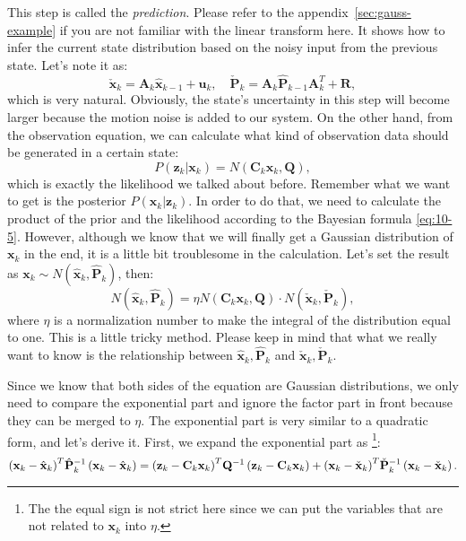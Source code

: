 This step is called the \textit{prediction}. Please refer to the appendix~\ref{sec:gauss-example} if you are not familiar with the linear transform here. It shows how to infer the current state distribution based on the noisy input from the previous state. Let's note it as:
\begin{equation}
	\check{\mathbf{x}}_k = {\mathbf{A}_k {{\hat{\mathbf{x}}}_{k - 1}} + {\mathbf{u}_k}}, \quad \check{\mathbf{P}}_k = {\mathbf{A}_k \hat{\mathbf{P}}_{k-1} { \mathbf{A}^T_k} + \mathbf{R}},
\end{equation}
which is very natural. Obviously, the state's uncertainty in this step will become larger because the motion noise is added to our system. On the other hand, from the observation equation, we can calculate what kind of observation data should be generated in a certain state:
\begin{equation}
	P\left( {{\mathbf{z}_k}|{\mathbf{x}_k}} \right) = N\left( {{\mathbf{C}_k}{\mathbf{x}_k},\mathbf{Q}} \right) ,
\end{equation}
which is exactly the likelihood we talked about before. Remember what we want to get is the posterior $P\left( {{\mathbf{x}_k}|{\mathbf{z}_k}} \right) $. In order to do that, we need to calculate the product of the prior and the likelihood according to the Bayesian formula \eqref{eq:10-5}. However, although we know that we will finally get a Gaussian distribution of $\mathbf{x}_k$ in the end, it is a little bit troublesome in the calculation. Let's set the result as $\mathbf{x}_k \sim N(\mathbf{\hat{x}}_k, \mathbf{\hat{P}}_k )$, then:
\begin{equation}
	N(\mathbf{\hat{x}}_k, \mathbf{\hat{P}}_k ) = \eta N\left( {{\mathbf{C}_k}{\mathbf{x}_k},\mathbf{Q}} \right) \cdot N( \mathbf{\check{x}}_k, \mathbf{\check{P}}_k),
\end{equation}
where $\eta$ is a normalization number to make the integral of the distribution equal to one. This is a little tricky method. Please keep in mind that what we really want to know is the relationship between $\hat{\mathbf{x}}_k, \hat{\mathbf{P}}_k$ and $\check{\mathbf{x}}_k, \check{\mathbf{P}}_k$. 

Since we know that both sides of the equation are Gaussian distributions, we only need to compare the exponential part and ignore the factor part in front because they can be merged to $\eta$. The exponential part is very similar to a quadratic form, and let's derive it. First, we expand the exponential part as \footnote{ The the equal sign is not strict here since we can put the variables that are not related to $\mathbf{x}_k$ into $\eta$. }:
\begin{equation}
	\small
	{\left( {{\mathbf{x}_k} - {{\hat{\mathbf{x}}}_k}} \right)^T}\hat{\mathbf{P}}_k^{ - 1}\left( {{\mathbf{x}_k} - {{\hat{\mathbf{x}}}_k}} \right) = {\left( {{\mathbf{z}_k} - {\mathbf{C}_k} {\mathbf{x}_k}} \right)^T}{\mathbf{Q}^{ - 1}}\left( {{\mathbf{z}_k} - {\mathbf{C}_k}{\mathbf{x}_k}} \right) + {\left( {{\mathbf{x}_k} - {{\check{\mathbf{x}}}_k}} \right)^T}\check{\mathbf{P}}_k^{ - 1}\left( {\mathbf{x}_k - {{\check{\mathbf{x}}}_k}} \right).
\end{equation}

